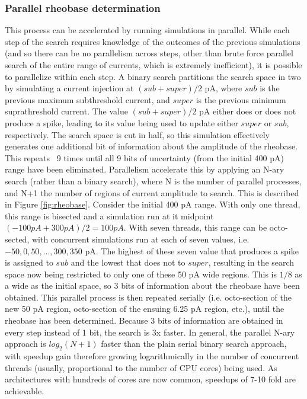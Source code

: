 \subsubsection{Parallel rheobase determination}
This process can be accelerated by running simulations in parallel.
While each step of the search requires knowledge of the outcomes of the previous simulations (and so there can be no parallelism across steps, other than brute force parallel search of the entire range of currents, which is extremely inefficient), it is possible to parallelize within each step.
A binary search partitions the search space in two by simulating a current injection at $(sub+super)/2$ pA, where $sub$ is the previous maximum subthreshold current, and $super$ is the previous minimum suprathreshold current.
The value $(sub+super)/2$ pA either does or does not produce a spike, leading to its value being used to update either $super$ or $sub$, respectively.
The search space is cut in half, so this simulation effectively generates one additional bit of information about the amplitude of the rheobase.
This repeats ~9 times until all 9 bits of uncertainty (from the initial 400 pA) range have been eliminated.
Parallelism accelerate this by applying an N-ary search (rather than a binary search), where N is the number of parallel processes, and N+1 the number of regions of current amplitude to search.
This is described in Figure \ref{fig:rheobase}.
Consider the initial 400 pA range.
With only one thread, this range is bisected and a simulation run at it midpoint $(-100 pA + 300 pA)/2 = 100 pA$.
With seven threads, this range can be octo-sected, with concurrent simulations run at each of seven values, i.e. ${-50, 0, 50, ..., 300, 350}$ pA.
The highest of these seven value that produces a spike is assigned to $sub$ and the lowest that does not to $super$, resulting in the search space now being restricted to only one of these 50 pA wide regions.
This is $1/8$ as a wide as the initial space, so 3 bits of information about the rheobase have been obtained.
This parallel process is then repeated serially (i.e. octo-section of the new 50 pA region, octo-section of the ensuing 6.25 pA region, etc.), until the rheobase has been determined.
Because 3 bits of information are obtained in every step instead of 1 bit, the search is 3x faster.
In general, the parallel N-ary approach is $log_2(N+1)$ faster than the plain serial binary search approach, with speedup gain therefore growing logarithmically in the number of concurrent threads (usually, proportional to the number of CPU cores) being used.
As architectures with hundreds of cores are now common, speedups of 7-10 fold are achievable.

